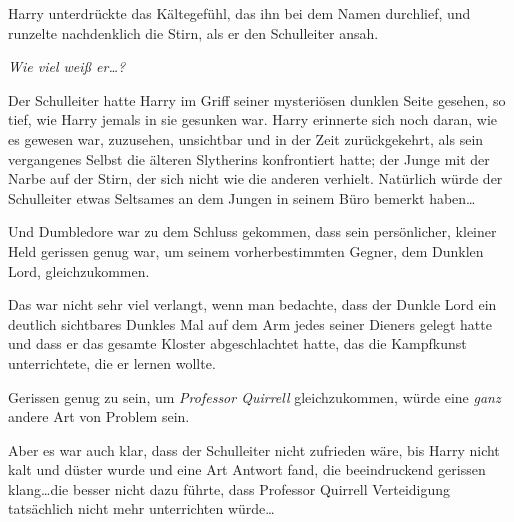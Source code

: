 Harry unterdrückte das Kältegefühl, das ihn bei dem Namen durchlief, und runzelte nachdenklich die Stirn, als er den Schulleiter ansah.

\emph{Wie viel weiß er…?}

Der Schulleiter hatte Harry im Griff seiner mysteriösen dunklen Seite gesehen, so tief, wie Harry jemals in sie gesunken war. Harry erinnerte sich noch daran, wie es gewesen war, zuzusehen, unsichtbar und in der Zeit zurückgekehrt, als sein vergangenes Selbst die älteren Slytherins konfrontiert hatte; der Junge mit der Narbe auf der Stirn, der sich nicht wie die anderen verhielt. Natürlich würde der Schulleiter etwas Seltsames an dem Jungen in seinem Büro bemerkt haben…

Und Dumbledore war zu dem Schluss gekommen, dass sein persönlicher, kleiner Held gerissen genug war, um seinem vorherbestimmten Gegner, dem Dunklen Lord, gleichzukommen.

Das war nicht sehr viel verlangt, wenn man bedachte, dass der Dunkle Lord ein deutlich sichtbares Dunkles Mal auf dem Arm jedes seiner Dieners gelegt hatte und dass er das gesamte Kloster abgeschlachtet hatte, das die Kampfkunst unterrichtete, die er lernen wollte.

Gerissen genug zu sein, um \emph{Professor Quirrell} gleichzukommen, würde eine \emph{ganz} andere Art von Problem sein.

Aber es war auch klar, dass der Schulleiter nicht zufrieden wäre, bis Harry nicht kalt und düster wurde und eine Art Antwort fand, die beeindruckend gerissen klang…die besser nicht dazu führte, dass Professor Quirrell Verteidigung tatsächlich nicht mehr unterrichten würde…

